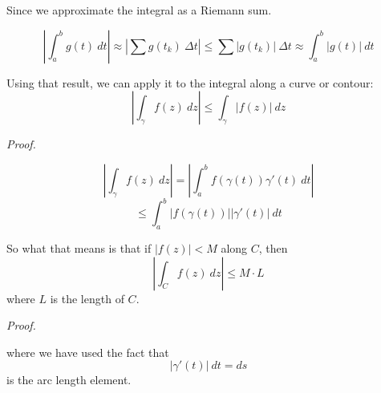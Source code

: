 \documentclass[11pt, oneside]{article}
\begin{document}
Since we approximate the integral as a Riemann sum.

\[ |\int_a^b g(t) \ dt| \approx | \sum g(t_k) \ \Delta t | \le \sum | g(t_k) | \ \Delta t \approx \int_a^b |g(t)| \ dt \]

Using that result, we can apply it to the integral along a curve or contour:
\[ | \int_\gamma f(z) \ dz |  \le \int_{\gamma} | f(z) | \ dz \]

\emph{Proof.}

\[ | \int_{\gamma} f(z) \ dz | = | \int_a^b f(\gamma(t)) \gamma'(t) \ dt | \]
\[ \le \int_a^b | f(\gamma(t)) | | \gamma'(t) | \ dt \]

So what that means is that if $|f(z)| < M$ along $C$, then
\[ | \int_C f(z) \ dz | \le M \cdot L \]
where $L$ is the length of $C$.

\emph{Proof.}

where we have used the fact that
\[ |\gamma'(t) | \ dt = ds \]
is the arc length element.
\end{document}
